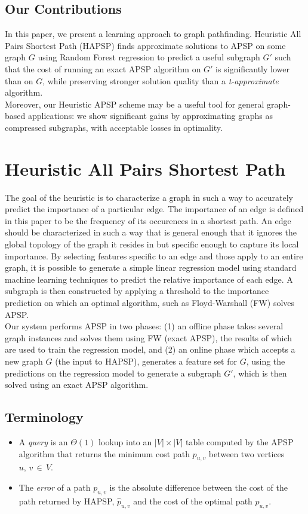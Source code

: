\documentclass[10.5pt,journal]{IEEEtran}
\begin{document}
\subsection{Our Contributions}
	In this paper, we present a learning approach to graph pathfinding. 
	Heuristic All Pairs Shortest Path (HAPSP)
	finds approximate solutions to APSP on some graph $G$
	using Random Forest regression to predict a useful subgraph $G'$ such that the cost of running an exact
	APSP algorithm on $G'$ is significantly lower than on $G$, while preserving stronger solution quality
	than a {\it{t-approximate}} algorithm. \\
	
	Moreover, our Heuristic APSP scheme may be a useful tool for general graph-based applications: we show
	significant gains by approximating graphs as compressed subgraphs, with acceptable losses in
	optimality. 

\section{Heuristic All Pairs Shortest Path}
The goal of the heuristic is to characterize a graph in such a way to accurately predict
the importance of a particular edge. The importance of an edge is defined in this paper to be the frequency of
its occurences in a shortest path. An edge should be characterized in such a way that is general enough
that it ignores the global topology of the graph it resides in but specific enough to capture its local
importance. By selecting features specific to an edge and those apply to an entire graph, it is possible to
generate a simple linear regression model using standard machine learning techniques to predict
the relative importance of each edge. A subgraph is then constructed by applying a threshold to the importance
prediction on which an optimal algorithm, such as Floyd-Warshall (FW) solves APSP.\\

Our system performs APSP in two phases: (1) an offline phase takes several graph instances and solves them
using FW (exact APSP), the results of which are used to train the regression model, and (2) an online phase
which accepts a new graph $G$ (the input to HAPSP), generates a feature set for $G$, using the predictions
on the regression model to generate a subgraph $G'$, which is then solved using an exact APSP algorithm.

\subsection{Terminology}
	\begin{itemize}
		\item A {\it{query}} is an $\Theta(1)$ lookup into an $|V|\times|V|$ table computed by
		the APSP algorithm that returns the minimum cost path $p_{u,v}$ between two 
		vertices $u,\,v\,\in\,V$.
		\item The {\it{error}} of a path $p_{u,v}$ is the absolute difference 
		between the cost of the path returned by HAPSP, $\hat{p}_{u,v}$ and the cost of the optimal
		path $p_{u,v}$. 
	\end{itemize}
\end{document}
